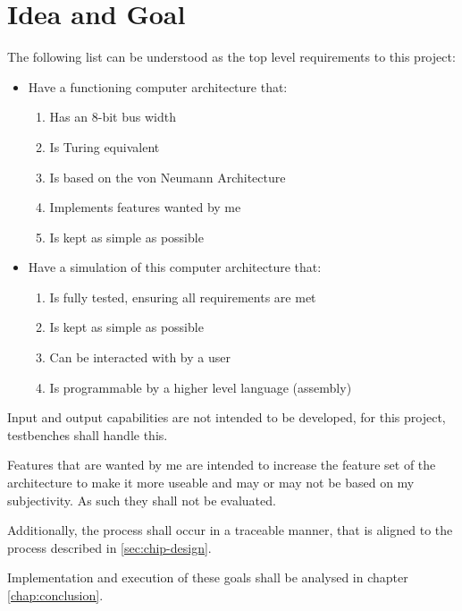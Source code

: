 \section{Idea and Goal} \label{sec:goals}  
The following list can be understood as the top level requirements to this project:
\begin{itemize}
  \item Have a functioning computer architecture that:
 \begin{enumerate}
    \item Has an 8-bit bus width
    \item Is Turing equivalent
    \item Is based on the von Neumann Architecture
    \item Implements features wanted by me
    \item Is kept as simple as possible
  \end{enumerate}
  \item Have a simulation of this computer architecture that: 
  \begin{enumerate}
    \item Is fully tested, ensuring all requirements are met
    \item Is kept as simple as possible
    \item Can be interacted with by a user
    \item Is programmable by a higher level language (assembly)
  \end{enumerate}
\end{itemize}

Input and output capabilities are not intended to be developed, for this project, testbenches shall handle this.

Features that are wanted by me are intended to increase the feature set of the architecture to make it more useable and may or may not be based on my subjectivity. As such they shall not be evaluated.

Additionally, the process shall occur in a traceable manner, that is aligned to the process described in \ref{sec:chip-design}.

Implementation and execution of these goals shall be analysed in chapter \ref{chap:conclusion}.
